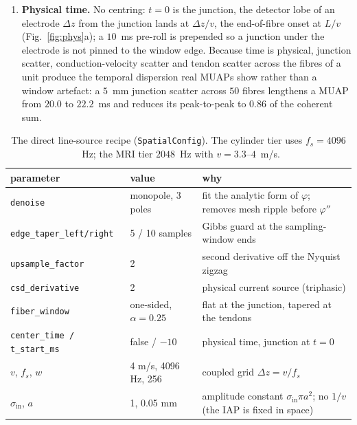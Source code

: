 \documentclass[11pt,a4paper]{article}
\begin{document}
\begin{enumerate}
  (Fig.~\ref{fig:phys}c). The taper costs $r=0.998$ against the sharp-tendon oracle.
\item \textbf{Physical time.} No centring: $t=0$ is the junction, the detector lobe of
  an electrode $\Delta z$ from the junction lands at $\Delta z/v$, the end-of-fibre
  onset at $L/v$ (Fig.~\ref{fig:phys}a); a $10$~ms pre-roll is prepended so a junction
  under the electrode is not pinned to the window edge. Because time is physical, junction
  scatter, conduction-velocity scatter and tendon scatter across the fibres of a unit
  produce the temporal dispersion real MUAPs show rather than a window artefact: a $5$~mm
  junction scatter across $50$ fibres lengthens a MUAP from $20.0$ to $22.2$~ms and
  reduces its peak-to-peak to $0.86$ of the coherent sum.
\end{enumerate}

\begin{table}[t]
\centering\small
\caption{The direct line-source recipe (\texttt{SpatialConfig}). The cylinder tier uses
$f_s = 4096$~Hz; the MRI tier $2048$~Hz with $v = 3.3$--$4$~m/s.}
\label{tab:recipe}
\begin{tabular}{llp{72mm}}
\toprule
parameter & value & why \\
\midrule
\texttt{denoise} & monopole, 3 poles & fit the analytic form of $\varphi$; removes mesh ripple before $\varphi''$ \\
\texttt{edge\_taper\_left/right} & 5 / 10 samples & Gibbs guard at the sampling-window ends \\
\texttt{upsample\_factor} & 2 & second derivative off the Nyquist zigzag \\
\texttt{csd\_derivative} & 2 & physical current source (triphasic) \\
\texttt{fiber\_window} & one-sided, $\alpha=0.25$ & flat at the junction, tapered at the tendons \\
\texttt{center\_time / t\_start\_ms} & false / $-10$ & physical time, junction at $t=0$ \\
$v$, $f_s$, $w$ & 4 m/s, 4096 Hz, 256 & coupled grid $\Delta z = v/f_s$ \\
$\sigma_{\mathrm{in}}$, $a$ & 1, 0.05 mm & amplitude constant $\sigma_{\mathrm{in}}\pi a^2$; no $1/v$ (the IAP is fixed in space) \\
\bottomrule
\end{tabular}
\end{table}
\end{document}
